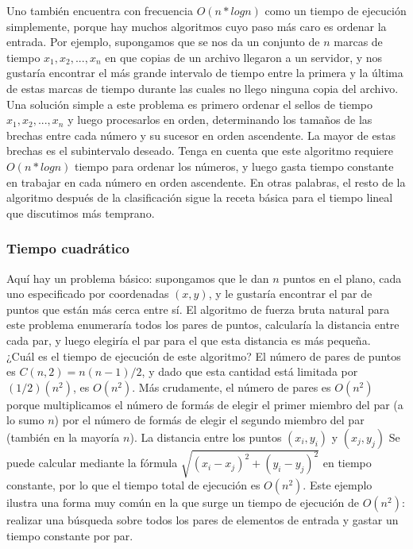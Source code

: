 \documentclass[a4paper, 12pt]{book}
\theoremstyle{dotless}
\begin{document}
Uno también encuentra con frecuencia $O(n*log n)$ como un tiempo de ejecución simplemente, porque hay muchos algoritmos cuyo paso más caro es ordenar la entrada. Por ejemplo, supongamos que se nos da un conjunto de $n$ marcas de tiempo $x_1, x_2,. . . , x_n$ en que copias de un archivo llegaron a un servidor, y nos gustaría encontrar el más grande intervalo de tiempo entre la primera y la última de estas marcas de tiempo durante las cuales no llego ninguna copia del archivo. Una solución simple a este problema es primero ordenar el sellos de tiempo $x_1, x_2,. . . , x_n$ y luego procesarlos en orden, determinando los tamaños de las brechas entre cada número y su sucesor en orden ascendente. La mayor de estas brechas es el subintervalo deseado. Tenga en cuenta que este algoritmo requiere $O(n*log n)$ tiempo para ordenar los números, y luego gasta tiempo constante en trabajar en cada número en orden ascendente. En otras palabras, el resto de la algoritmo después de la clasificación sigue la receta básica para el tiempo lineal que discutimos más temprano.\\

\subsubsection*{Tiempo cuadrático} 
Aquí hay un problema básico: supongamos que le dan $n$ puntos en el plano, cada uno especificado por coordenadas $(x,y)$, y le gustaría encontrar el par de puntos que están más cerca entre sí. El algoritmo de fuerza bruta natural para este problema enumeraría todos los pares de puntos, calcularía la distancia entre cada par, y luego elegiría el par para el que esta distancia es más pequeña.\\

¿Cuál es el tiempo de ejecución de este algoritmo? El número de pares de puntos es $C(n,2)=n(n-1)/2$, y dado que esta cantidad está limitada por $(1/2)(n^2)$, es $O(n^2)$. Más crudamente, el número de pares es $O(n^2)$ porque multiplicamos el número de formás de elegir el primer miembro del par (a lo sumo $n$) por el número de formás de elegir el segundo miembro del par (también en la mayoría $n$). La distancia entre los puntos \((x_{i},y_{i})\) y \((x_{j},y_{j})\) Se puede calcular mediante la fórmula
\(\sqrt{(x_{i}-x_{j})^2+(y_{i}-y_{j})^2}\) en tiempo constante, por lo que el tiempo total de ejecución es $O(n^2)$. Este ejemplo ilustra una forma muy común en la que surge un tiempo de ejecución de $O(n^2)$: realizar una búsqueda sobre todos los pares de elementos de entrada y gastar un tiempo constante por par.\\
\end{document}
